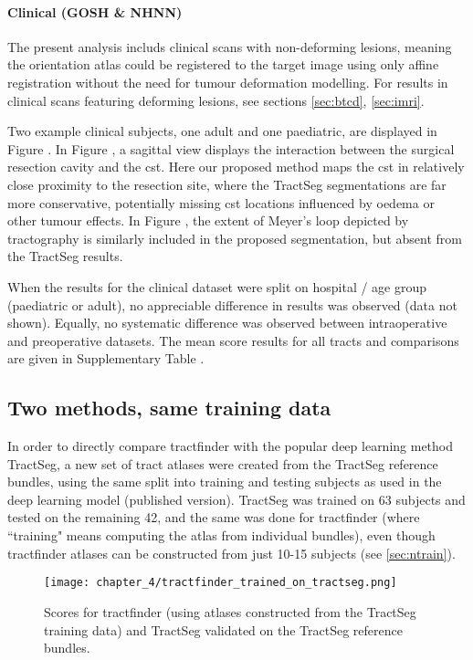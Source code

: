 \paragraph*{Clinical (GOSH \& NHNN)}

The present analysis includs clinical scans with non-deforming lesions, meaning the orientation atlas could be registered to the target image using only affine registration without the need for tumour deformation modelling.
For results in clinical scans featuring deforming lesions, see sections \ref{sec:btcd}, \ref{sec:imri}. %

Two example clinical subjects, one adult and one paediatric, are displayed in Figure .
In Figure , a sagittal view displays the interaction between the surgical resection cavity and the \gls{cst}.
Here our proposed method maps the \gls{cst} in relatively close proximity to the resection site, where the TractSeg segmentations are far more conservative, potentially missing \gls{cst} locations influenced by oedema or other tumour effects.
In Figure , the extent of Meyer's loop depicted by tractography is similarly included in the proposed segmentation, but absent from the TractSeg results.

When the results for the clinical dataset were split on hospital / age group (paediatric or adult), no appreciable difference in results was observed (data not shown).
Equally, no systematic difference was observed between intraoperative and preoperative datasets.
The mean score results for all tracts and comparisons are given in Supplementary Table .

\subsection{Two methods, same training data}

In order to directly compare tractfinder with the popular deep learning method TractSeg, a new set of tract atlases were created from the TractSeg reference bundles, using the same split into training and testing subjects as used in the deep learning model (published version).
TractSeg was trained on 63 subjects and tested on the remaining 42, and the same was done for tractfinder (where ``training" means computing the atlas from individual bundles), even though tractfinder atlases can be constructed from just 10-15 subjects (see \ref{sec:ntrain}).

\begin{figure}[htb!]
  \texttt{[image: chapter\_4/tractfinder\_trained\_on\_tractseg.png]}
  \caption{Scores for tractfinder (using atlases constructed from the TractSeg training data) and TractSeg validated on the TractSeg reference bundles.}
  \label{fig:ts_atlas}
\end{figure}

